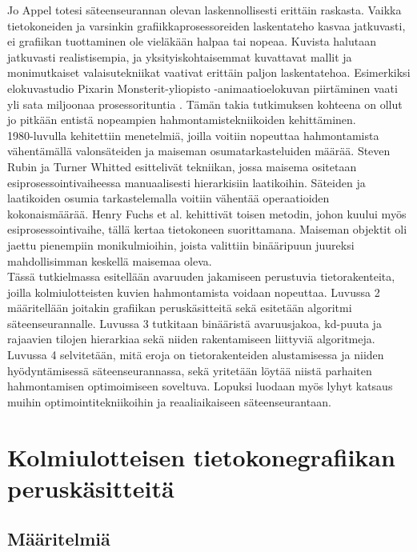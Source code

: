 \documentclass[a4paper, 12pt, titlepage]{article}
\begin{document}
Jo Appel totesi säteenseurannan olevan laskennollisesti erittäin raskasta. Vaikka tietokoneiden ja varsinkin grafiikkaprosessoreiden laskentateho kasvaa jatkuvasti, ei grafiikan tuottaminen ole vieläkään halpaa tai nopeaa. Kuvista halutaan jatkuvasti realistisempia, ja yksityiskohtaisemmat kuvattavat mallit ja monimutkaiset valaisutekniikat vaativat erittäin paljon laskentatehoa. Esimerkiksi elokuvastudio Pixarin Monsterit-yliopisto -animaatioelokuvan piirtäminen vaati yli sata miljoonaa prosessorituntia \citep{monsterit}. Tämän takia tutkimuksen kohteena on ollut jo pitkään entistä nopeampien hahmontamistekniikoiden kehittäminen.\\

1980-luvulla kehitettiin menetelmiä, joilla voitiin nopeuttaa hahmontamista vähentämällä valonsäteiden ja maiseman osumatarkasteluiden määrää. Steven Rubin ja Turner Whitted esittelivät tekniikan, jossa maisema ositetaan esiprosessointivaiheessa manuaalisesti hierarkisiin laatikoihin. Säteiden ja laatikoiden osumia tarkastelemalla voitiin vähentää operaatioiden kokonaismäärää. \citep[.]{rubin} Henry Fuchs et al. kehittivät toisen metodin, johon kuului myös esiprosessointivaihe, tällä kertaa tietokoneen suorittamana. Maiseman objektit oli jaettu pienempiin monikulmioihin, joista valittiin binääripuun juureksi mahdollisimman keskellä maisemaa oleva. \citep[.]{fuchs}\\

Tässä tutkielmassa esitellään avaruuden jakamiseen perustuvia tietorakenteita, joilla kolmiulotteisten kuvien hahmontamista voidaan nopeuttaa. Luvussa 2 määritellään joitakin grafiikan peruskäsitteitä sekä esitetään algoritmi säteenseurannalle. Luvussa 3 tutkitaan binääristä avaruusjakoa, kd-puuta ja rajaavien tilojen hierarkiaa sekä niiden rakentamiseen 	liittyviä algoritmeja. Luvussa 4 selvitetään, mitä eroja on tietorakenteiden alustamisessa ja niiden hyödyntämisessä säteenseurannassa, sekä yritetään löytää niistä parhaiten hahmontamisen optimoimiseen soveltuva. Lopuksi luodaan myös lyhyt katsaus muihin optimointitekniikoihin ja reaaliaikaiseen säteenseurantaan.

\newpage
\section{Kolmiulotteisen tietokonegrafiikan peruskäsitteitä}
\subsection{Määritelmiä}
\end{document}
